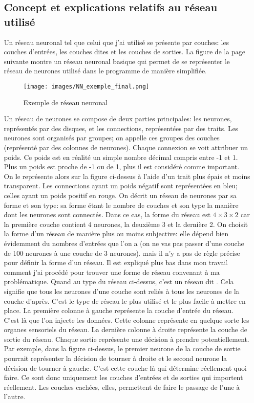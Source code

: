 \documentclass[12pt, a4paper, openany]{book}
\begin{document}
\subsection{Concept et explications relatifs au réseau utilisé}
\label{r:2.3.1}
Un réseau neuronal tel que celui que j'ai utilisé se présente par couches: les couches d'entrées, les couches dites \fg{} et les couches de sorties. La figure de la page suivante montre un réseau neuronal basique qui permet de se représenter le réseau de neurones utilisé dans le programme de manière simplifiée.
\begin{figure}[H]
    \centering
    \texttt{[image: images/NN\_exemple\_final.png]}
    \caption{Exemple de réseau neuronal}
\end{figure}
Un réseau de neurones se compose de deux parties principales: les neurones, représentés par des disques, et les connections, représentées par des traits. Les neurones sont organisés par groupes; on appelle ces groupes des couches (représenté par des colonnes de neurones). Chaque connexion se voit attribuer un poids. Ce poids est en réalité un simple nombre décimal compris entre -1 et 1.
Plus un poids est proche de -1 ou de 1, plus il est considéré comme important. On le représente alors sur la figure ci-dessus à l'aide d'un trait plus épais et moins transparent. Les connections ayant un poids négatif sont représentées en bleu; celles ayant un poids positif en rouge. On décrit un réseau de neurones par sa forme et son type: sa forme étant le nombre de couches et son type la manière dont les neurones sont connectés.\newline
Dans ce cas, la forme du réseau est $4\times3\times2$ car la première couche contient 4 neurones, la deuxième 3 et la dernière 2. On choisit la forme d'un réseau de manière plus ou moins subjective: elle dépend bien évidemment du nombres d'entrées que l'on a (on ne vas pas passer d'une couche de 100 neurones à une couche de 3 neurones), mais il n'y a pas de règle précise pour définir la forme d'un réseau. Il est expliqué plus bas dans mon travail comment j'ai procédé pour trouver une forme de réseau convenant à ma problématique.\newline
Quand au type du réseau ci-dessus, c'est un réseau dit \fg. Cela signifie que tous les neurones d'une couche sont reliés à tous les neurones de la couche d'après. C'est le type de réseau le plus utilisé et le plus facile à mettre en place.\newline
La première colonne à gauche représente la couche d'entrée du réseau. C'est là que l'on injecte les données. Cette colonne représente en quelque sorte les organes sensoriels du réseau. La dernière colonne à droite représente la couche de sortie du réseau. Chaque sortie représente une décision à prendre potentiellement. Par exemple, dans la figure ci-dessus, le premier neurone de la couche de sortie pourrait représenter la décision de tourner à droite et le second neurone la décision de tourner à gauche. C'est cette couche là qui détermine réellement quoi faire. Ce sont donc uniquement les couches d'entrées et de sorties qui importent réellement. Les couches cachées, elles, permettent de faire le passage de l'une à l'autre.\newline
\end{document}

